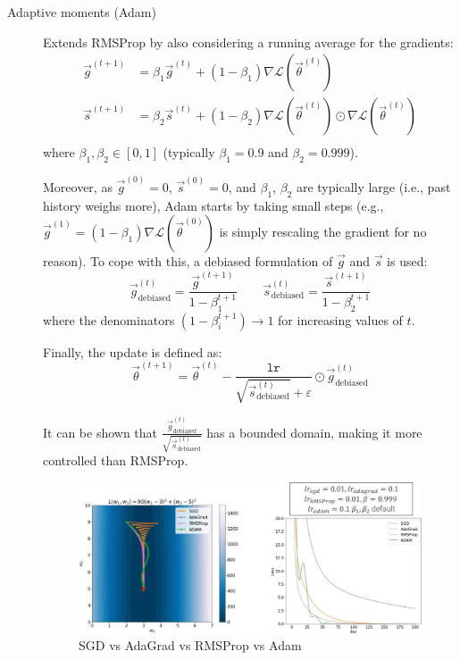 \begin{description}
    \item[Adaptive moments (Adam)] 
        Extends RMSProp by also considering a running average for the gradients:
        \[
            \begin{split}
                \vec{g}^{(t+1)} &= \beta_1 \vec{g}^{(t)} + (1-\beta_1) \nabla\mathcal{L}(\vec{\theta}^{(t)}) \\
                \vec{s}^{(t+1)} &= \beta_2 \vec{s}^{(t)} + (1-\beta_2) \nabla\mathcal{L}(\vec{\theta}^{(t)}) \odot \nabla\mathcal{L}(\vec{\theta}^{(t)}) \\
            \end{split}
        \]
        where $\beta_1, \beta_2 \in [0, 1]$ (typically $\beta_1 = 0.9$ and $\beta_2 = 0.999$).

        Moreover, as $\vec{g}^{(0)} = 0$, $\vec{s}^{(0)} = 0$, and $\beta_1$, $\beta_2$ are typically large (i.e., past history weighs more), Adam starts by taking small steps (e.g., $\vec{g}^{(1)} = (1-\beta_1) \nabla\mathcal{L}(\vec{\theta}^{(0)})$ is simply rescaling the gradient for no reason). To cope with this, a debiased formulation of $\vec{g}$ and $\vec{s}$ is used:
        \[
            \vec{g}^{(t)}_{\text{debiased}} = \frac{\vec{g}^{(t+1)}}{1-\beta_1^{t+1}} 
            \qquad
            \vec{s}^{(t)}_{\text{debiased}} = \frac{\vec{s}^{(t+1)}}{1-\beta_2^{t+1}} 
        \]
        where the denominators $(1-\beta_i^{t+1}) \rightarrow 1$ for increasing values of $t$.

        Finally, the update is defined as:
        \[
            \vec{\theta}^{(t+1)} = \vec{\theta}^{(t)} - \frac{\texttt{lr}}{\sqrt{\vec{s}^{(t)}_{\text{debiased}}} + \varepsilon} \odot \vec{g}^{(t)}_{\text{debiased}}
        \]

        \begin{remark}
            It can be shown that $\frac{\vec{g}^{(t)}_{\text{debiased}}}{\sqrt{\vec{s}^{(t)}_{\text{debiased}}}}$ has a bounded domain, making it more controlled than RMSProp.
        \end{remark}

        \begin{figure}[H]
            \centering
            \includegraphics[width=0.75\linewidth]{./img/adam.jpg}
            \caption{SGD vs AdaGrad vs RMSProp vs Adam}
        \end{figure}


\end{description}
